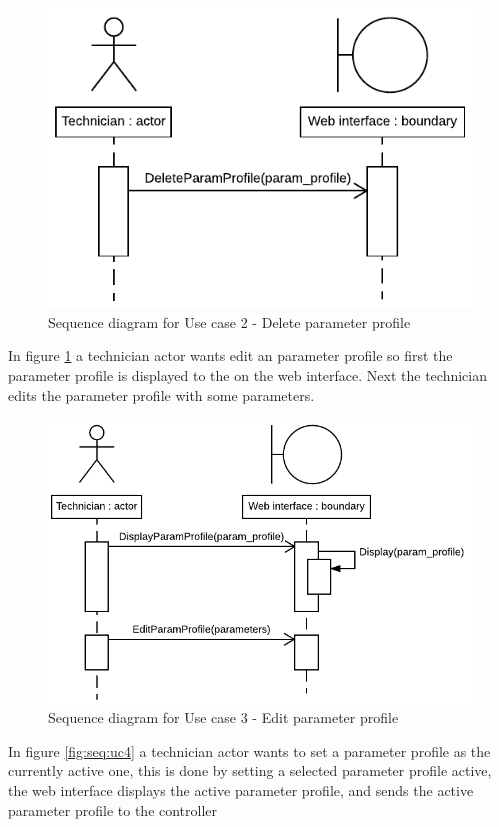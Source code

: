 \begin{figure}[H]
	\centering
	\includegraphics[width=0.7\linewidth]{Images/System_architecture/Use_case_2_SD}
	\caption{Sequence diagram for Use case 2 - Delete parameter profile}
	\label{fig:seq:uc2}
\end{figure}

In figure \ref{fig:seq:uc2} a technician actor wants edit an parameter profile so first the parameter profile is displayed to the on the web interface. Next the technician edits the parameter profile with some parameters.

\begin{figure}[H]
	\centering
	\includegraphics[width=1\linewidth]{Images/System_architecture/Use_case_3_SD}
	\caption{Sequence diagram for Use case 3 - Edit parameter profile}
	\label{fig:seq:uc3}
\end{figure}

In figure \ref{fig:seq:uc4} a technician actor wants to set a parameter profile as the currently active one, this is done by setting a selected parameter profile active, the web interface displays the active parameter profile, and sends the active parameter profile to the controller

